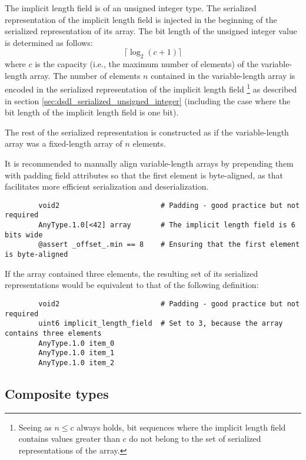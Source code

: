 The implicit length field is of an unsigned integer type.
The serialized representation of the implicit length field
is injected in the beginning of the serialized representation of its array.
The bit length of the unsigned integer value is determined as follows:
$$\lceil{}\log_2 (c + 1)\rceil{}$$
where $c$ is the capacity (i.e., the maximum number of elements) of the variable-length array.
The number of elements $n$ contained in the variable-length array is encoded
in the serialized representation of the implicit length field%
\footnote{%
    Seeing as $n \leq c$ always holds, bit sequences where the implicit length field contains values
    greater than $c$ do not belong to the set of serialized representations of the array.
}
as described in section \ref{sec:dsdl_serialized_unsigned_integer}
(including the case where the bit length of the implicit length field is one bit).

The rest of the serialized representation is constructed as if the variable-length array was
a fixed-length array of $n$ elements.

\begin{remark}
    It is recommended to manually align variable-length arrays by prepending them with padding field attributes
    so that the first element is byte-aligned, as that facilitates more efficient serialization and deserialization.

    \begin{verbatim}
        void2                        # Padding - good practice but not required
        AnyType.1.0[<42] array       # The implicit length field is 6 bits wide
        @assert _offset_.min == 8    # Ensuring that the first element is byte-aligned
    \end{verbatim}

    If the array contained three elements,
    the resulting set of its serialized representations would be equivalent to that of the following definition:

    \begin{verbatim}
        void2                        # Padding - good practice but not required
        uint6 implicit_length_field  # Set to 3, because the array contains three elements
        AnyType.1.0 item_0
        AnyType.1.0 item_1
        AnyType.1.0 item_2
    \end{verbatim}
\end{remark}

\subsection{Composite types}

